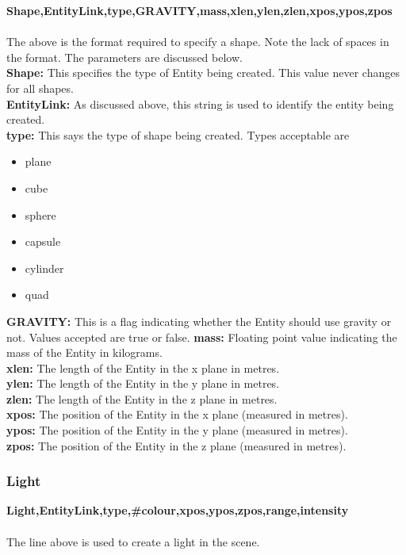 \documentclass[a4paper,12pt]{article}
\begin{document}
\textbf{Shape,EntityLink,type,GRAVITY,mass,xlen,ylen,zlen,xpos,ypos,zpos}\\\\
The above is the format required to specify a shape. Note the lack of spaces in the format. The parameters are discussed below.\\
\textbf{Shape:} This specifies the type of Entity being created. This value never changes for all shapes.\\
\textbf{EntityLink:} As discussed above, this string is used to identify the entity being created.\\
\textbf{type:} This says the type of shape being created. Types acceptable are 
\begin{itemize}
\item plane
\item cube
\item sphere
\item capsule
\item cylinder
\item quad
\end{itemize}
\textbf{GRAVITY:} This is a flag indicating whether the Entity should use gravity or not. Values accepted are true or false.
\newline
\textbf{mass:} Floating point value indicating the mass of the Entity in kilograms.\\
\textbf{xlen:} The length of the Entity in the x plane in metres.\\
\textbf{ylen:} The length of the Entity in the y plane in metres.\\
\textbf{zlen:} The length of the Entity in the z plane in metres.\\
\textbf{xpos:} The position of the Entity in the x plane (measured in metres).\\
\textbf{ypos:} The position of the Entity in the y plane (measured in metres).\\
\textbf{zpos:} The position of the Entity in the z plane (measured in metres).\\

\subsubsection{Light}

\textbf{Light,EntityLink,type,\#colour,xpos,ypos,zpos,range,intensity}\\\\

The line above is used to create a light in the scene.
\end{document}
